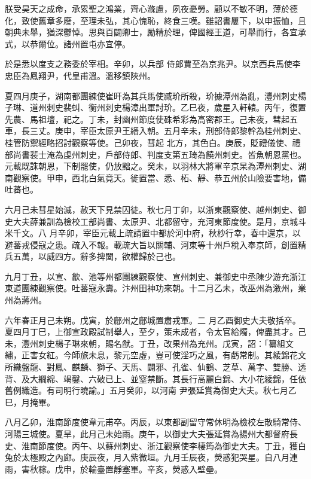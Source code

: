 \begin{pinyinscope}
 朕受昊天之成命，承累聖之鴻業，齊心滌慮，夙夜憂勞。顧以不敏不明，薄於德化，致使舊章多廢，至理未弘，其心愧恥，終食三嘆。雖詔書屢下，以申振恤，且朝典未舉，猶深鬱悼。思與百闢卿士，勵精於理，俾國經王道，可舉而行，各宜承式，以恭爾位。諸州置屯亦宜停。



 於是悉以度支之務委於宰相。辛卯，以兵部
 侍郎賈至為京兆尹。以京西兵馬使李忠臣為鳳翔尹，代皇甫溫。溫移鎮陜州。



 夏四月庚子，湖南都團練使崔旰為其兵馬使臧玠所殺，玠據潭州為亂，灃州刺史楊子琳、道州刺史裴虯、衡州刺史楊漳出軍討玠。乙巳夜，歲星入軒轅。丙午，復置先農、馬祖壇，祀之。丁未，封幽州節度使硃希彩為高密郡王。己未夜，彗起五車，長三丈。庚申，宰臣太原尹王縉入朝。五月辛未，刑部侍郎黎幹為桂州刺史、桂管防禦經略招討觀察等使。己卯夜，彗起
 北方，其色白。庚辰，貶禮儀使、禮部尚書裴士淹為虔州刺史，戶部侍郎、判度支第五琦為饒州刺史。皆魚朝恩黨也。元載既誅朝恩，下制罷使，仍放黜之。癸未，以羽林大將軍辛京杲為潭州刺史、湖南觀察使。甲申，西北白氣竟天。徙置當、悉、柘、靜、恭五州於山險要害地，備吐蕃也。



 六月己未彗星始滅，赦天下見禁囚徒。秋七月丁卯，以浙東觀察使、越州刺史、御史大夫薛兼訓為檢校工部尚書、太原尹、北都留守，充河東節度使。是月，京城斗米千文。八
 月辛卯，宰臣元載上疏請置中都於河中府，秋杪行幸，春中還京，以避蕃戎侵寇之患。疏入不報。載疏大旨以關輔、河東等十州戶稅入奉京師，創置精兵五萬，以威四方。辭多捭闔，欲權歸於己也。



 九月丁丑，以宣、歙、池等州都團練觀察使、宣州刺史、兼御史中丞陳少游充浙江東道團練觀察使。吐蕃寇永壽。汴州田神功來朝。十二月乙未，改巫州為漵州，業州為蔣州。



 六年春正月己未朔。戊寅，於鄜州之鄜城置肅戎軍。二
 月乙酉御史大夫敬括卒。夏四月丁巳，上御宣政殿試制舉人，至夕，策未成者，令太官給燭，俾盡其才。己未，灃州刺史楊子琳來朝，賜名猷。丁丑，改果州為充州。戊寅，詔：「纂組文繡，正害女紅。今師旅未息，黎元空虛，豈可使淫巧之風，有虧常制。其綾錦花文所織盤龍、對鳳、麒麟、獅子、天馬、闢邪、孔雀、仙鶴、芝草、萬字、雙勝、透背、及大繝綿、竭鑿、六破已上、並窒禁斷。其長行高麗白錦、大小花綾錦，任依舊例織造。有司明行曉諭。」五月癸卯，以河南
 尹張延賞為御史大夫。秋七月乙巳，月掩畢。



 八月乙卯，淮南節度使韋元甫卒。丙辰，以東都副留守常休明為檢校左散騎常侍、河陽三城使。夏旱，此月己未始雨。庚午，以御史大夫張延賞為揚州大都督府長史、淮南節度使。丙午、以蘇州刺史、浙江觀察使李棲筠為御史大夫。丁丑，獲白兔於太極殿之內廊。庚辰夜，月入紫微垣。九月壬辰夜，熒惑犯哭星。自八月連雨，害秋稼。戊申，於輪臺置靜塞軍。辛亥，熒惑入壁壘。




\end{pinyinscope}
